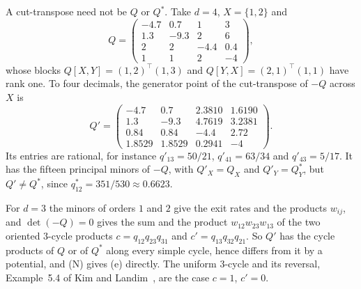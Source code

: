 A cut-transpose need not be $Q$ or $Q^*$. Take $d=4$, $X=\{1,2\}$ and
\[
 Q=\begin{pmatrix}-4.7&0.7&1&3\\1.3&-9.3&2&6\\2&2&-4.4&0.4\\1&1&2&-4\end{pmatrix},
\]
whose blocks $Q[X,Y]=(1,2)^\top(1,3)$ and $Q[Y,X]=(2,1)^\top(1,1)$ have rank one.
To four decimals, the generator point of the cut-transpose of $-Q$ across $X$ is
\[
 Q'=\begin{pmatrix}-4.7&0.7&2.3810&1.6190\\1.3&-9.3&4.7619&3.2381\\
 0.84&0.84&-4.4&2.72\\1.8529&1.8529&0.2941&-4\end{pmatrix}.
\]
Its entries are rational, for instance $q'_{13}=50/21$, $q'_{41}=63/34$ and
$q'_{43}=5/17$. It has the fifteen principal minors of $-Q$, with $Q'_X=Q_X$ and
$Q'_Y=Q^*_Y$, but $Q'\ne Q^*$, since $q^*_{12}=351/530\approx0.6623$.

\begin{remark}\label{rem:three-states}
For $d=3$ the minors of orders $1$ and $2$ give the exit rates and the products
$w_{ij}$, and $\det(-Q)=0$ gives the sum and the product $w_{12}w_{23}w_{13}$ of
the two oriented $3$-cycle products $c=q_{12}q_{23}q_{31}$ and
$c'=q_{13}q_{32}q_{21}$. So $Q'$ has the cycle products of $Q$ or of $Q^*$
along every simple cycle, hence differs from it by a potential, and (N) gives
(e) directly. The uniform $3$-cycle and its reversal, Example~5.4 of Kim and
Landim~\cite{kl2024}, are the case $c=1$, $c'=0$.
\end{remark}

